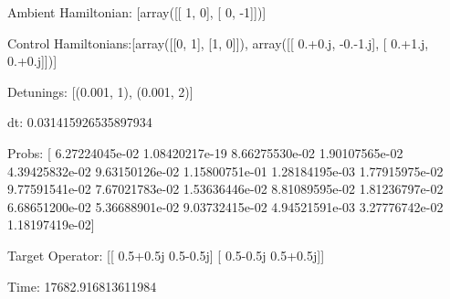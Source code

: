 \documentclass{article}
\begin{document}
    

\newpage

Ambient Hamiltonian: [array([[ 1,  0],
       [ 0, -1]])]

Control Hamiltonians:[array([[0, 1],
       [1, 0]]), array([[ 0.+0.j, -0.-1.j],
       [ 0.+1.j,  0.+0.j]])]

Detunings: [(0.001, 1), (0.001, 2)]

 dt: 0.031415926535897934

Probs: [  6.27224045e-02   1.08420217e-19   8.66275530e-02   1.90107565e-02
   4.39425832e-02   9.63150126e-02   1.15800751e-01   1.28184195e-03
   1.77915975e-02   9.77591541e-02   7.67021783e-02   1.53636446e-02
   8.81089595e-02   1.81236797e-02   6.68651200e-02   5.36688901e-02
   9.03732415e-02   4.94521591e-03   3.27776742e-02   1.18197419e-02]

Target Operator: [[ 0.5+0.5j  0.5-0.5j]
 [ 0.5-0.5j  0.5+0.5j]]

Time: 17682.916813611984
\end{document}
